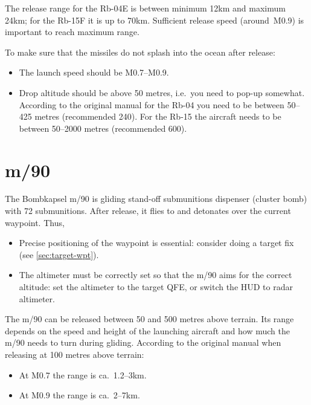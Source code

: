The release range for the Rb-04E is between minimum 12km and maximum 24km;
for the Rb-15F it is up to 70km.
Sufficient release speed (around~M0.9) is important to reach maximum range.

To make sure that the missiles do not splash into the ocean after release:
\begin{itemize}
  \item The launch speed should be M0.7--M0.9.
  \item Drop altitude should be above 50 metres, i.e.\ you need to pop-up somewhat.
    According to the original manual for the Rb-04 you need to be between 50--425 metres (recommended 240).
    For the Rb-15 the aircraft needs to be between 50--2000 metres (recommended 600).
\end{itemize}

\section{m/90}
The Bombkapsel m/90 is gliding stand-off submunitions dispenser (cluster bomb) with 72 submunitions.
After release, it flies to and detonates over the current waypoint.
Thus,
\begin{itemize}
  \item Precise positioning of the waypoint is essential:
    consider doing a target fix (see \cref{sec:target-wpt}).
  \item The altimeter must be correctly set so that the m/90 aims for the correct altitude:
    set the altimeter to the target QFE, or switch the HUD to radar altimeter.
\end{itemize}

The m/90 can be released between 50 and 500 metres above terrain.
Its range depends on the speed and height of the launching aircraft and how much the m/90 needs to turn during gliding.
According to the original manual when releasing at 100 metres above terrain:
\begin{itemize}[nosep]
  \item At M0.7 the range is ca.\ 1.2--3km.
  \item At M0.9 the range is ca.\ 2--7km.
\end{itemize}
